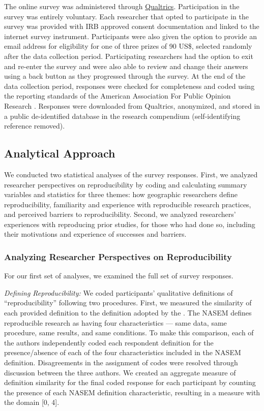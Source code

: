 \documentclass[]{interact}
\theoremstyle{plain}%
\theoremstyle{definition}
\theoremstyle{remark}
\begin{document}
The online survey was administered through \href{https://www.qualtrics.com/}{Qualtrics}. 
Participation in the survey was entirely voluntary. 
Each researcher that opted to participate in the survey was provided with IRB approved consent documentation and linked to the internet survey instrument. 
Participants were also given the option to provide an email address for eligibility for one of three  prizes of 90 US\$, selected randomly after the data collection period.
Participating researchers had the option to exit and re-enter the survey and were also able to review and change their answers using a back button as they progressed through the survey.
At the end of the data collection period, responses were checked for completeness and coded using the reporting standards of the American Association For Public Opinion Research \citep{aaporstandards}.
Responses were downloaded from Qualtrics, anonymized, and stored in a public de-identified database in the research compendium (self-identifying reference removed).

\subsection*{Analytical Approach}

We conducted two statistical analyses of the survey responses.
First, we analyzed researcher perspectives on reproducibility by coding and calculating summary variables and statistics for three themes: how geographic researchers define reproducibility, familiarity and experience with reproducible research practices, and perceived barriers to reproducibility.
Second, we analyzed researchers' experiences with reproducing prior studies, for those who had done so, including their motivations and experience of successes and barriers.

\subsubsection*{Analyzing Researcher Perspectives on Reproducibility}

\noindent For our first set of analyses, we examined the full set of survey responses.

\textit{Defining Reproducibility:} 
We coded participants' qualitative definitions of ``reproducibility'' following two procedures.
First, we measured the similarity of each provided definition to the definition adopted by the \citet{NASEM2019}. 
The NASEM defines reproducible research as having four characteristics --- same data, same procedure, same results, and same conditions.
To make this comparison, each of the authors independently coded each respondent definition for the presence/absence of each of the four characteristics included in the NASEM definition.
Disagreements in the assignment of codes were resolved through discussion between the three authors.
We created an aggregate measure of definition similarity for the final coded response for each participant by counting the presence of each NASEM definition characteristic, resulting in a measure with the domain [0, 4].
\end{document}
